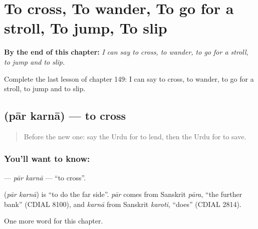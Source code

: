 
\chapter{To cross, To wander, To go for a stroll, To jump, To slip}
\label{ch:ur-to-cross-to-wander-to-go-for-a-stroll-to-jump-to-slip}

\begin{chapteropening}
\textbf{By the end of this chapter:} \emph{I can say to cross, to wander, to go for a stroll, to jump and to slip.}

Complete the last lesson of chapter 149: I can say to cross, to wander, to go for a stroll, to jump and to slip.
\end{chapteropening}

\section[\texorpdfstring{\ur{پار} \ur{کرنا} (pār karnā)}{پار کرنا (pār karnā)}]{  (pār karnā) — to cross}

\label{lesson:UR-C149-par-karna}



\begin{quote}
Before the new one: say the Urdu for to lend, then the Urdu for to save.
\end{quote}

\subsection*{You'll want to know:  }
\textbf{ } — \emph{pār karnā} — \textquotedblleft{}to cross\textquotedblright{}.

\begin{cousinweb}
\textbf{ } (\emph{pār karnā}) is \textquotedblleft{}to do the far side\textquotedblright{}. \emph{pār} comes from Sanskrit \emph{pāra}, \textquotedblleft{}the further bank\textquotedblright{} (CDIAL 8100), and \emph{karnā} from Sanskrit \emph{karoti}, \textquotedblleft{}does\textquotedblright{} (CDIAL 2814).
\end{cousinweb}

\begin{grammarlens}[title={What you've built}]
One more word for this chapter.
\end{grammarlens}

